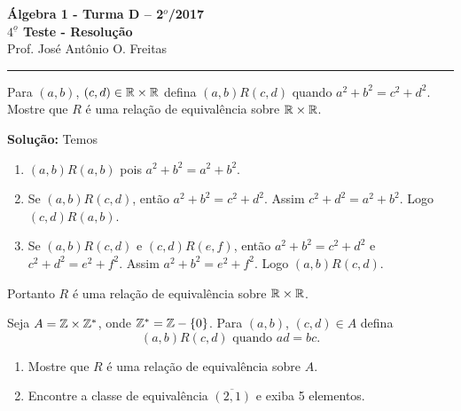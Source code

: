 \documentclass[12pt]{article}
\begin{document}


\begin{center}
{\Large\bf {\'A}lgebra 1 - Turma D -- 2$^{o}$/2017} \\ \vspace{9pt} {\large\bf
  $4^{\underline{o}}$ Teste - Resolu\c{c}\~ao}\\
\vspace{9pt} Prof. Jos{\'e} Ant{\^o}nio O. Freitas
\end{center}
\hrule

\vspace{.6cm}

\questao Para $(a,b)$, $(c,d) \in \mathbb{R} \times \mathbb{R}$ defina $(a,b)R(c,d)$ quando $a^2 + b^2 = c^2 + d^2$. Mostre que $R$ é uma relação de equivalência sobre $\mathbb{R} \times \mathbb{R}$.

\noindent\textbf{Solu\c{c}\~ao:} Temos
\begin{enumerate}[label={\roman*})]
	\item $(a,b)R(a,b)$ pois $a^2 + b^2 = a^2 + b^2$.
	\item Se $(a,b)R(c,d)$, então $a^2 + b^2 = c^2 + d^2$. Assim $c^2 + d^2 = a^2 +  b^2$. Logo $(c,d)R(a,b)$.
	\item Se $(a,b)R(c,d)$ e $(c,d)R(e,f)$, então $a^2 + b^2 = c^2 + d^2$ e $c^2 + d^2 = e^2 + f^2$. Assim $a^2 + b^2 = e^2 + f^2$. Logo $(a,b)R(c,d)$.
\end{enumerate}

Portanto $R$ é uma relação de equivalência sobre $\mathbb{R} \times \mathbb{R}$.


\vspace{.5cm}

\questao Seja $A = \mathbb{Z} \times \mathbb{Z}^*$, onde $\mathbb{Z}^* = \mathbb{Z} - \{0\}$. Para $(a,b)$, $(c,d) \in A$ defina
\[
	(a,b)R(c,d) \mbox{ quando } ad=bc.
\]

\begin{enumerate}[label={\alph*})]
	\item Mostre que $R$ é uma rela{\c c}{\~a}o de equival{\^e}ncia sobre $A$.
	\item Encontre a classe de equivalência $\overline{(2,1)}$ e exiba 5 elementos.
\end{enumerate}
\end{document}
